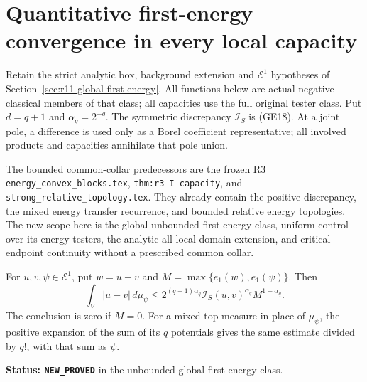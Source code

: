 \section{Quantitative first-energy convergence in every local capacity}
\label{sec:r11-first-energy-capacity-topology}

Retain the strict analytic box, background extension and
$\mathcal E^1$ hypotheses of
Section~\ref{sec:r11-global-first-energy}.
All functions below are actual negative classical members
of that class; all capacities use the full original tester
class. Put $d=q+1$ and $\alpha_q=2^{-q}$.
The symmetric discrepancy $\mathscr I_S$ is (GE18).
At a joint pole, a difference is used only as a Borel
coefficient representative; all involved products and
capacities annihilate that pole union.

The bounded common-collar predecessors are the frozen R3
\texttt{energy\_convex\_blocks.tex},
\texttt{thm:r3-I-capacity}, and
\texttt{strong\_relative\_topology.tex}.
They already contain the positive discrepancy, the mixed
energy transfer recurrence, and bounded relative energy
topologies. The new scope here is the global unbounded
first-energy class, uniform control over its energy testers,
the analytic all-local domain extension, and critical
endpoint continuity without a prescribed common collar.

\begin{theorem}
\label{thm:r11-first-energy-uniform-tester}
For $u,v,\psi\in\mathcal E^1$, put $w=u+v$ and
$M=\max\{e_1(w),e_1(\psi)\}$. Then
\[
 \boxed{\quad
 \int_V|u-v|\,d\mu_\psi
   \leq 2^{(q-1)\alpha_q}
          \mathscr I_S(u,v)^{\alpha_q}M^{1-\alpha_q}.
 \quad}
 \tag{EV1}
\]
The conclusion is zero if $M=0$. For a mixed top measure
in place of $\mu_\psi$, the positive expansion of the sum
of its $q$ potentials gives the same estimate divided by
$q!$, with that sum as $\psi$.
\end{theorem}

\noindent\textbf{Status: \texttt{NEW\_PROVED}} in the
unbounded global first-energy class.

